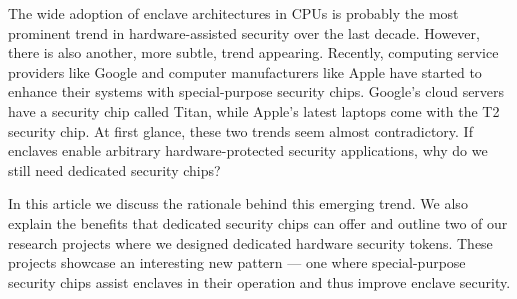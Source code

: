 The wide adoption of enclave architectures in CPUs is probably the most prominent trend in hardware-assisted security over the last decade. However, there is also another, more subtle, trend appearing. Recently, computing service providers like Google and computer manufacturers like Apple have started to enhance their systems with special-purpose security chips. Google's cloud servers have a security chip called Titan, while Apple's latest laptops come with the T2 security chip. At first glance, these two trends seem almost contradictory. If enclaves enable arbitrary hardware-protected security applications, why do we still need dedicated security chips? 

In this article we discuss the rationale behind this emerging trend. We also explain the benefits that dedicated security chips can offer and outline two of our research projects where we designed dedicated hardware security tokens. These projects showcase an interesting new pattern --- one where special-purpose security chips assist enclaves in their operation and thus improve enclave security. 

